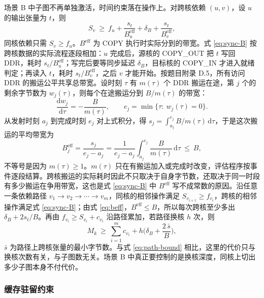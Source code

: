 场景 B 中子图不再单独激活，时间约束落在操作上。对跨核依赖 $(u,v)$，设 $u$ 的输出张量为 $t$，则
\begin{equation}
  S_v\ \ge\ f_u+\frac{s_t}{B_u^{\mathrm{eff}}}+\delta_B+\frac{s_t}{B_v^{\mathrm{eff}}},
  \label{eq:sync-B}
\end{equation}
同核依赖只需 $S_v\ge f_u$。$B^{\mathrm{eff}}$ 为 COPY 执行时实际分到的带宽。式 \eqref{eq:sync-B} 按跨核数据的实际流程逐段相加：$u$ 完成后，源核的 COPY\_OUT 把 $t$ 写回 DDR，耗时 $s_t/B_u^{\mathrm{eff}}$；写完后要等同步延迟 $\delta_B$，目标核的 COPY\_IN 才进入就绪判定；再读入 $t$，耗时 $s_t/B_v^{\mathrm{eff}}$，之后 $v$ 才能开始。按题目附录 D.5，所有访问 DDR 的搬运公平共享总带宽。设时刻 $\tau$ 有 $m(\tau)$ 个 DDR 搬运在途，第 $j$ 个的剩余字节数为 $w_j(\tau)$，则每个在途搬运分到 $B/m(\tau)$ 的带宽：
\begin{equation}
  \frac{\mathrm{d}w_j}{\mathrm{d}\tau}=-\frac{B}{m(\tau)},\qquad
  e_j=\min\{\tau:\ w_j(\tau)=0\}.
  \label{eq:fair-share}
\end{equation}
从发射时刻 $a_j$ 到完成时刻 $e_j$ 对上式积分，得 $s_j=\int_{a_j}^{e_j}B/m(\tau)\,\mathrm{d}\tau$，于是这次搬运的平均带宽为
\begin{equation}
  B^{\mathrm{eff}}_j=\frac{s_j}{e_j-a_j}=\frac{1}{e_j-a_j}\int_{a_j}^{e_j}\frac{B}{m(\tau)}\,\mathrm{d}\tau\ \le\ B ,
  \label{eq:beff}
\end{equation}
不等号是因为 $m(\tau)\ge 1$。$m(\tau)$ 只在有搬运加入或完成时改变，评估程序按事件逐段结算。跨核搬运的实际耗时因此不只取决于自身字节数，还取决于同一时段有多少搬运在争用带宽，这也是式 \eqref{eq:sync-B} 中 $B^{\mathrm{eff}}$ 写不成常数的原因。沿任意一条依赖路径 $v_1\to v_2\to\cdots\to v_m$，同核的相邻操作满足 $S_{v_{i+1}}\ge f_{v_i}$，跨核的相邻操作满足式 \eqref{eq:sync-B}；由式 \eqref{eq:beff}，$B^{\mathrm{eff}}\le B$，所以每次跨核至少多出 $\delta_B+2s_t/B$。再由 $f_{v_i}\ge S_{v_i}+c_{v_i}$ 沿路径累加，若路径换核 $h$ 次，则
\begin{equation}
  M_k\ \ge\ \sum_{i=1}^{m} c_{v_i}+h\Big(\delta_B+\frac{2\,\bar s}{B}\Big),
  \label{eq:path-B}
\end{equation}
$\bar s$ 为路径上跨核张量的最小字节数。与式 \eqref{eq:path-bound} 相比，这里的代价只与换核次数有关，与子图数无关。场景 B 中真正要控制的是换核深度，同核上切出多少子图本身不付代价。

\subsubsection{缓存驻留约束}

